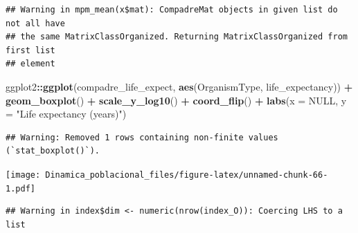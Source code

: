 \documentclass[
]{book}
\newenvironment{Shaded}{\begin{snugshade}}{\end{snugshade}}
\newcommand{\AttributeTok}[1]{\textcolor[rgb]{0.13,0.29,0.53}{#1}}
\newcommand{\CommentTok}[1]{\textcolor[rgb]{0.56,0.35,0.01}{\textit{#1}}}
\newcommand{\ConstantTok}[1]{\textcolor[rgb]{0.56,0.35,0.01}{#1}}
\newcommand{\FunctionTok}[1]{\textcolor[rgb]{0.13,0.29,0.53}{\textbf{#1}}}
\newcommand{\NormalTok}[1]{#1}
\newcommand{\OtherTok}[1]{\textcolor[rgb]{0.56,0.35,0.01}{#1}}
\newcommand{\SpecialCharTok}[1]{\textcolor[rgb]{0.81,0.36,0.00}{\textbf{#1}}}
\newcommand{\StringTok}[1]{\textcolor[rgb]{0.31,0.60,0.02}{#1}}
\theoremstyle{definition}
\theoremstyle{definition}
\theoremstyle{definition}
\theoremstyle{definition}
\theoremstyle{remark}
\begin{document}
\begin{verbatim}
## Warning in mpm_mean(x$mat): CompadreMat objects in given list do not all have
## the same MatrixClassOrganized. Returning MatrixClassOrganized from first list
## element
\end{verbatim}

\begin{Shaded}
\begin{Highlighting}[]
\NormalTok{ggplot2}\SpecialCharTok{::}\FunctionTok{ggplot}\NormalTok{(compadre\_life\_expect, }\FunctionTok{aes}\NormalTok{(OrganismType, life\_expectancy)) }\SpecialCharTok{+}
  \FunctionTok{geom\_boxplot}\NormalTok{() }\SpecialCharTok{+}
  \FunctionTok{scale\_y\_log10}\NormalTok{() }\SpecialCharTok{+}
  \FunctionTok{coord\_flip}\NormalTok{() }\SpecialCharTok{+}
  \FunctionTok{labs}\NormalTok{(}\AttributeTok{x =} \ConstantTok{NULL}\NormalTok{, }\AttributeTok{y =} \StringTok{"Life expectancy (years)"}\NormalTok{)}
\end{Highlighting}
\end{Shaded}

\begin{verbatim}
## Warning: Removed 1 rows containing non-finite values (`stat_boxplot()`).
\end{verbatim}

\texttt{[image: Dinamica\_poblacional\_files/figure-latex/unnamed-chunk-66-1.pdf]}

\begin{Shaded}
\end{Shaded}

\begin{verbatim}
## Warning in index$dim <- numeric(nrow(index_O)): Coercing LHS to a list
\end{verbatim}
\end{document}

